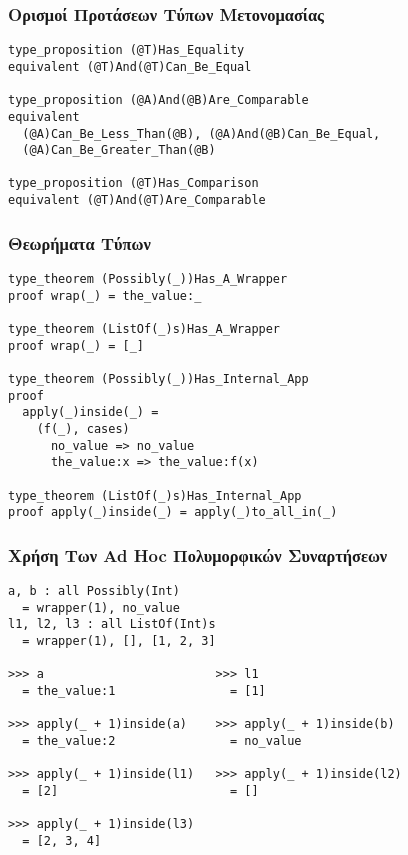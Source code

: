 \documentclass{beamer}
\def\e{\foreignlanguage{english}}
\begin{document}
\begin{frame}[fragile]

\frametitle{Ορισμοί Προτάσεων Τύπων Μετονομασίας}

\begin{otherlanguage}{english}
\begin{verbatim}
type_proposition (@T)Has_Equality
equivalent (@T)And(@T)Can_Be_Equal

type_proposition (@A)And(@B)Are_Comparable
equivalent
  (@A)Can_Be_Less_Than(@B), (@A)And(@B)Can_Be_Equal,
  (@A)Can_Be_Greater_Than(@B)

type_proposition (@T)Has_Comparison
equivalent (@T)And(@T)Are_Comparable
\end{verbatim}
\end{otherlanguage}

\end{frame}

\begin{frame}[fragile]

\frametitle{Θεωρήματα Τύπων}

\begin{otherlanguage}{english}
\begin{verbatim}
type_theorem (Possibly(_))Has_A_Wrapper
proof wrap(_) = the_value:_

type_theorem (ListOf(_)s)Has_A_Wrapper
proof wrap(_) = [_]

type_theorem (Possibly(_))Has_Internal_App
proof
  apply(_)inside(_) =
    (f(_), cases)
      no_value => no_value
      the_value:x => the_value:f(x)

type_theorem (ListOf(_)s)Has_Internal_App
proof apply(_)inside(_) = apply(_)to_all_in(_)
\end{verbatim}
\end{otherlanguage}

\end{frame}

\begin{frame}[fragile]

\frametitle{Χρήση Των \e{Ad Hoc} Πολυμορφικών Συναρτήσεων}

\begin{otherlanguage}{english}
\begin{verbatim}
a, b : all Possibly(Int)
  = wrapper(1), no_value
l1, l2, l3 : all ListOf(Int)s
  = wrapper(1), [], [1, 2, 3]

>>> a                        >>> l1
  = the_value:1                = [1]

>>> apply(_ + 1)inside(a)    >>> apply(_ + 1)inside(b)
  = the_value:2                = no_value

>>> apply(_ + 1)inside(l1)   >>> apply(_ + 1)inside(l2)
  = [2]                        = []

>>> apply(_ + 1)inside(l3)
  = [2, 3, 4]
\end{verbatim}
\end{otherlanguage}

\end{frame}
\end{document}
